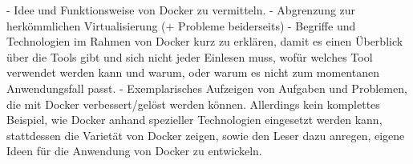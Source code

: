 - Idee und Funktionsweise von Docker zu vermitteln.
- Abgrenzung zur herkömmlichen Virtualisierung (+ Probleme beiderseits)
- Begriffe und Technologien im Rahmen von Docker kurz zu erklären, damit es einen Überblick über die Tools gibt und sich nicht jeder Einlesen muss, wofür welches Tool verwendet werden kann und warum, oder warum es nicht zum momentanen Anwendungsfall passt.
- Exemplarisches Aufzeigen von Aufgaben und Problemen, die mit Docker verbessert/gelöst werden können. Allerdings kein komplettes Beispiel, wie Docker anhand spezieller Technologien eingesetzt werden kann, stattdessen die Varietät von Docker zeigen, sowie den Leser dazu anregen, eigene Ideen für die Anwendung von Docker zu entwickeln.
